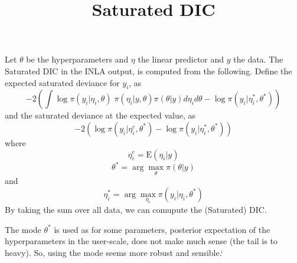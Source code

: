 \documentclass{article}
\begin{document}
\title{Saturated DIC}
\maketitle

Let $\theta$ be the hyperparameters and $\eta$ the linear predictor
and $y$ the data. The Saturated DIC in the INLA output, is computed
from the following. Define the expected saturated deviance for $y_i$,
as
\begin{displaymath}
    -2\left(\int \log\pi(y_i|\eta_i,\theta)\; \pi(\eta_i|y,\theta)
      \pi(\theta|y) d\eta_i d\theta
      - \log\pi(y_i|\eta_i^{*}, \theta^{*}) \right)
\end{displaymath}
and the saturated deviance at the expected value, as
\begin{displaymath}
    -2\left(\log\pi(y_i|\eta_i^{e},\theta^{*}) 
      - \log\pi(y_i|\eta_i^{*}, \theta^{*})\right)
\end{displaymath}
where
\begin{displaymath}
    \eta_i^{e}=\text{E}(\eta_i|y)
\end{displaymath}
\begin{displaymath}
    \theta^{*} = \arg\max_{\theta} \pi(\theta|y)
\end{displaymath}
and
\begin{displaymath}
    \eta_i^{*} = \arg\max_{\eta_i}\pi(y_i|\eta_i, \theta^{*})
\end{displaymath}
By taking the sum over all data, we can comupute the (Saturated) DIC.

The mode $\theta^{*}$ is used as for some parameters, posterior
expectation of the hyperparameters in the user-scale, does not make
much sense (the tail is to heavy). So, using the mode seems more
robust and sensible.`
\end{document}
